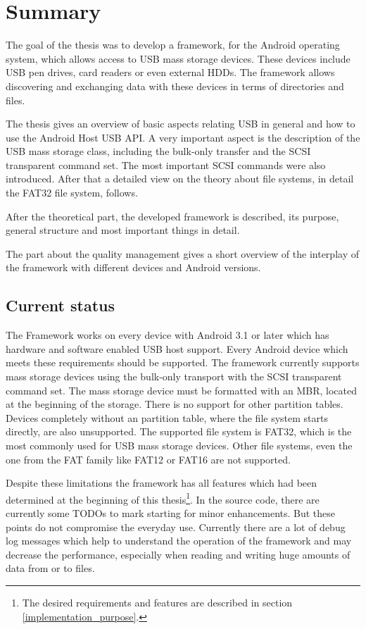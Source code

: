 \chapter{Summary}

The goal of the thesis was to develop a framework, for the Android operating system, which allows access to USB mass storage devices. These devices include USB pen drives, card readers or even external HDDs. The framework allows discovering and exchanging data with these devices in terms of directories and files.

The thesis gives an overview of basic aspects relating USB in general and how to use the Android Host USB API. A very important aspect is the description of the USB mass storage class, including the bulk-only transfer and the SCSI transparent command set. The most important SCSI commands were also introduced. After that a detailed view on the theory about file systems, in detail the FAT32 file system, follows.

After the theoretical part, the developed framework is described, its purpose, general structure and most important things in detail.

The part about the quality management gives a short overview of the interplay of the framework with different devices and Android versions.

\section{Current status}

The Framework works on every device with Android 3.1 or later which has hardware and software enabled USB host support. Every Android device which meets these requirements should be supported. The framework currently supports mass storage devices using the bulk-only transport with the SCSI transparent command set. The mass storage device must be formatted with an MBR, located at the beginning of the storage. There is no support for other partition tables. Devices completely without an partition table, where the file system starts directly, are also unsupported. The supported file system is FAT32, which is the most commonly used for USB mass storage devices. Other file systems, even the one from the FAT family like FAT12 or FAT16 are not supported.

Despite these limitations the framework has all features which had been determined at the beginning of this thesis\footnote{The desired requirements and features are described in section \ref{implementation_purpose}.}. In the source code, there are currently some TODOs to mark starting for minor enhancements. But these points do not compromise the everyday use. Currently there are a lot of debug log messages which help to understand the operation of the framework and may decrease the performance, especially when reading and writing huge amounts of data from or to files.

